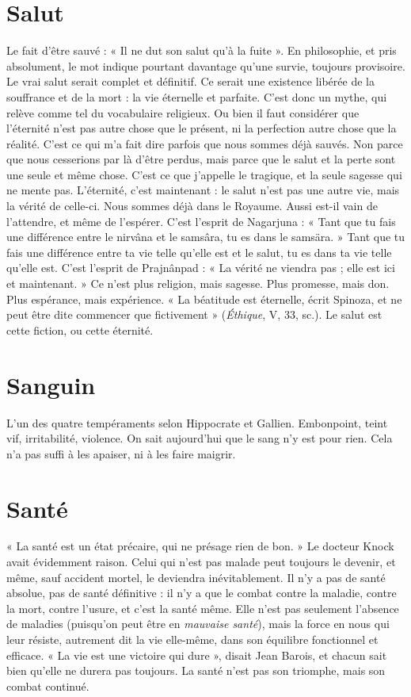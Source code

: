 \section{Salut}
Le fait d’être sauvé : « Il ne dut son salut qu’à la fuite ». En philosophie,
et pris absolument, le mot indique pourtant davantage qu’une
survie, toujours provisoire. Le vrai salut serait complet et définitif. Ce serait une
existence libérée de la souffrance et de la mort : la vie éternelle et parfaite. C’est
donc un mythe, qui relève comme tel du vocabulaire religieux. Ou bien il faut
considérer que l'éternité n’est pas autre chose que le présent, ni la perfection
autre chose que la réalité. C’est ce qui m’a fait dire parfois que nous sommes
déjà sauvés. Non parce que nous cesserions par là d’être perdus, mais parce que
le salut et la perte sont une seule et même chose. C’est ce que j’appelle le tragique,
et la seule sagesse qui ne mente pas. L’éternité, c’est maintenant : le salut
n'est pas une autre vie, mais la vérité de celle-ci. Nous sommes déjà dans le
Royaume. Aussi est-il vain de l’attendre, et même de l’espérer. C’est l'esprit de
Nagarjuna : « Tant que tu fais une différence entre le nirvâna et le samsâra, tu
es dans le samsära. » Tant que tu fais une différence entre ta vie telle qu’elle est
et le salut, tu es dans ta vie telle qu’elle est. C’est l'esprit de Prajnânpad : « La
vérité ne viendra pas ; elle est ici et maintenant. » Ce n’est plus religion, mais
sagesse. Plus promesse, mais don. Plus espérance, mais expérience. « La béatitude
est éternelle, écrit Spinoza, et ne peut être dite commencer que
fictivement » ({\it Éthique}, V, 33, sc.). Le salut est cette fiction, ou cette éternité.

\section{Sanguin}
L'un des quatre tempéraments selon Hippocrate et Gallien. Embonpoint,
teint vif, irritabilité, violence. On sait aujourd’hui que le
sang n'y est pour rien. Cela n’a pas suffi à les apaiser, ni à les faire maigrir.

\section{Santé}
« La santé est un état précaire, qui ne présage rien de bon. » Le docteur
Knock avait évidemment raison. Celui qui n’est pas malade
peut toujours le devenir, et même, sauf accident mortel, le deviendra inévitablement.
Il n’y a pas de santé absolue, pas de santé définitive : il n’y a que le
combat contre la maladie, contre la mort, contre l’usure, et c’est la santé même.
Elle n’est pas seulement l’absence de maladies (puisqu’on peut être en {\it mauvaise
santé}), mais la force en nous qui leur résiste, autrement dit la vie elle-même,
dans son équilibre fonctionnel et efficace. « La vie est une victoire qui dure »,
disait Jean Barois, et chacun sait bien qu’elle ne durera pas toujours. La santé
n'est pas son triomphe, mais son combat continué.

